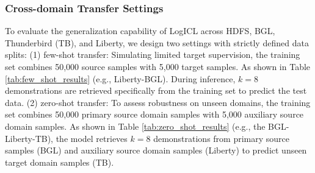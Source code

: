 \documentclass[lettersize,journal]{IEEEtran}
\begin{document}


\subsubsection{Cross-domain Transfer Settings}To evaluate the generalization capability of LogICL across HDFS, BGL, Thunderbird (TB), and Liberty, we design two settings with strictly defined data splits: (1) few-shot transfer: Simulating limited target supervision, the training set combines 50,000 source samples with 5,000 target samples. As shown in Table \ref{tab:few_shot_results}  (e.g., Liberty-BGL). During inference, $k=8$ demonstrations are retrieved specifically from the training set to predict the test data. (2) zero-shot transfer: To assess robustness on unseen domains, the training set combines 50,000 primary source domain samples with 5,000 auxiliary source domain samples. As shown in Table \ref{tab:zero_shot_results} (e.g., the BGL-Liberty-TB), the model retrieves $k=8$ demonstrations from primary source samples (BGL) and auxiliary source domain samples (Liberty) to predict unseen target domain samples (TB).
\end{document}
